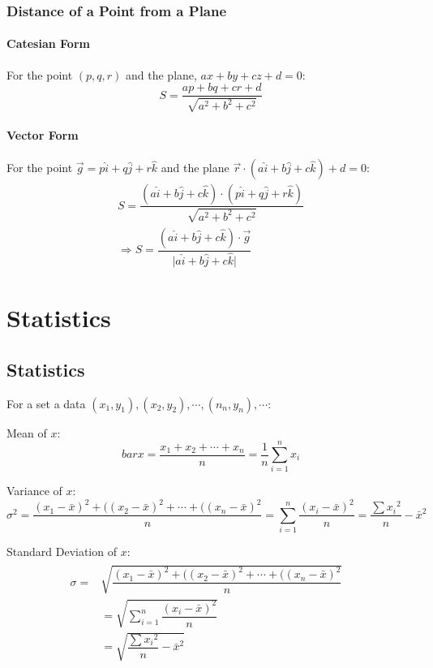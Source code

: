 \documentclass[openany, oneside]{book}
\begin{document}
\section{Distance of a Point from a Plane}
\subsection{Catesian Form}
For the point $(p,q,r)$ and the plane, $ax+by+cz+d=0$:
\begin{equation}
S=\dfrac{ap+bq+cr+d}{\sqrt{a^2+b^2+c^2}}
\end{equation}
\subsection{Vector Form}
For the point $\vec{g}=p\hat{i}+q\hat{j}+r\hat{k}$ and the plane $\vec{r}\cdot(a\hat{i}+b\hat{j}+c\hat{k})+d=0$:
\begin{align}
S=\dfrac{(a\hat{i}+b\hat{j}+c\hat{k})\cdot(p\hat{i}+q\hat{j}+r\hat{k})}{\sqrt{a^2+b^2+c^2}}\\
\Rightarrow S=\dfrac{(a\hat{i}+b\hat{j}+c\hat{k})\cdot\vec{g}}{\lvert a\hat{i}+b\hat{j}+c\hat{k} \rvert}
\end{align}

\part{Statistics}
\large{\chapter{Statistics}}
For a set a data $(x_1,y_1),(x_2,y_2),\cdots,(n_n,y_n),\cdots$:\newline

Mean of $x$:\begin{equation}
bar{x}=\dfrac{x_1+x_2+\cdots+x_n}{n}=\dfrac{1}{n}\sum_{i=1}^n x_i
\end{equation}

Variance of $x$:
\begin{equation}
\sigma^2=\dfrac{(x_1-\bar{x})^2+((x_2-\bar{x})^2+\cdots+((x_n-\bar{x})^2}{n}=\sum_{i=1}^n \dfrac{(x_i-\bar{x})^2}{n}=\dfrac{\sum {x_i}^2}{n}-\bar{x}^2
\end{equation}

Standard Deviation of $x$:
\begin{equation}
\begin{aligned}
\begin{split}
\sigma=&\sqrt{\dfrac{(x_1-\bar{x})^2+((x_2-\bar{x})^2+\cdots+((x_n-\bar{x})^2}{n}}&\\&=\sqrt{\sum_{i=1}^n \dfrac{(x_i-\bar{x})^2}{n}}&\\&=\sqrt{\dfrac{\sum {x_i}^2}{n}-\bar{x}^2}
\end{split}
\end{aligned}
\end{equation}
\end{document}
